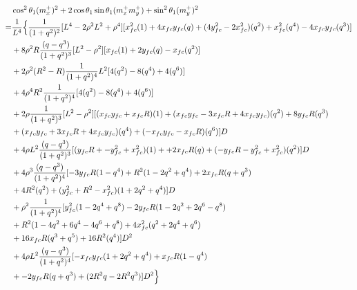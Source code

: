 \documentclass[12pt]{article}
\begin{document}
\begin{align}
    &\cos^2\theta_1(m_x^+)^2  + 2\cos\theta_1\sin\theta_1(m_x^+m_y^+)  +\sin^2\theta_1(m_y^+)^2 \\
    =& \frac{1}{L^4} \Bigl\{ \frac{1}{(1+q^2)^2} [ L^4 -2\rho^2L^2 + \rho^4 ][x_{fc}^2(1) + 4x_{fc}y_{fc}(q) + (4y_{fc}^2 -2x_{fc}^2)(q^2) +x_{fc}^2(q^4)   - 4x_{fc}y_{fc}(q^3) ] \nonumber\\
    &+  8\rho^2R\frac{(q-q^3)}{(1+q^2)^3}[ L^2 - \rho^2 ][ x_{fc}(1) + 2y_{fc}(q) - x_{fc}(q^2) ] \nonumber\\
    &+ 2\rho^2(R^2-R)\frac{1}{(1+q^2)^4}L^2[4(q^2)-8(q^4)+4(q^6)] \nonumber\\
    &+ 4\rho^4R^2\frac{1}{(1+q^2)^4}[ 4(q^2)-8(q^4)+4(q^6) ] \nonumber\\
    &+ 2\rho\frac{1}{(1+q^2)^3}[ L^2 - \rho^2 ][ (x_{fc}y_{fc} + x_{fc}R)(1) + (x_{fc}y_{fc} - 3x_{fc}R + 4x_{fc}y_{fc} )(q^2) + 8y_{fc}R(q^3) \nonumber\\
    &+ (x_{fc}y_{fc} + 3x_{fc}R + 4x_{fc}y_{fc})(q^4) + (- x_{fc}y_{fc} - x_{fc}R )(q^6) ]D \nonumber\\
    &+ 4\rho L^2\frac{(q-q^3)}{(1+q^2)^3}[( y_{fc}R + -y_{fc}^2 + x_{fc}^2 )(1) + + 2x_{fc}R(q)+  (-y_{fc}R -y_{fc}^2 + x_{fc}^2)(q^2) ]D \nonumber\\
    &+ 4\rho^3\frac{(q-q^3)}{(1+q^2)^4}[ -3y_{fc}R(1-q^4) +R^2(1-2q^2+q^4) + 2x_{fc}R(q+q^3) \nonumber\\
    &+ 4R^2(q^2) +  (y_{fc}^2 +R^2 -x_{fc}^2)(1+2q^2+q^4)  ]D \nonumber\\
    &+ \rho^2\frac{1}{(1+q^2)^4}[y_{fc}^2(1-2q^4+q^8) -2y_{fc}R(1-2q^2+2q^6-q^8) \nonumber\\
    &+R^2(1-4q^2+ 6q^4-4q^6+q^8) + 4x_{fc}^2(q^2+2q^4+q^6) \nonumber\\
    &+ 16x_{fc}R(q^3+q^5) + 16R^2(q^4)]D^2 \nonumber\\
    &+ 4\rho L^2\frac{(q-q^3)}{(1+q^2)^4}[-x_{fc}y_{fc}(1+2q^2+q^4) + x_{fc}R(1-q^4) \nonumber\\
    &+ -2y_{fc}R(q+q^3) +  (2R^2q-2R^2q^3) ]D^2 \Bigr\}
\end{align}
\end{document}
